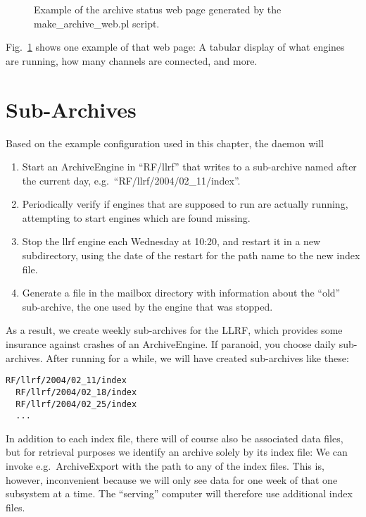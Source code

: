 \begin{figure}[htb]
\begin{center}
\end{center}
\caption{\label{fig:archcfgstat}Example of the archive status web page
  generated by the make\_archive\_web.pl script.}
\end{figure}

\noindent  Fig.~\ref{fig:archcfgstat} shows one example of that web
page: A tabular display of what engines are running, how many channels are
connected, and more.

\section{Sub-Archives}
Based on the example configuration used in this chapter,
the daemon will 
\begin{enumerate}
\item Start an ArchiveEngine in ``RF/llrf'' that writes to
      a sub-archive named after the current day,
      e.g.\ ``RF/llrf/2004/02\_11/index''.
\item Periodically verify if engines that are supposed to run are
      actually running, attempting to start engines which are found missing.
\item Stop the llrf engine each Wednesday at 10:20, and restart it in
      a new subdirectory, using the date of the restart for the path name to the
      new index file.
\item Generate a file in the mailbox directory with information about
      the ``old'' sub-archive, the one used by the engine that was
      stopped.
\end{enumerate}

\noindent As a result, we create weekly sub-archives for the LLRF,
which provides some insurance against crashes of an
ArchiveEngine. If paranoid, you choose daily sub-archives.
After running for a while, we will have created sub-archives like these:
\begin{lstlisting}[frame=none,keywordstyle=\sffamily]
  RF/llrf/2004/02_11/index
  RF/llrf/2004/02_18/index
  RF/llrf/2004/02_25/index
  ...
\end{lstlisting}
\noindent In addition to each index file, there will of course also be
associated data files, but for retrieval purposes we identify an
archive solely by its index file: We can invoke e.g.\ ArchiveExport
with the path to any of the index files. This is, however,
inconvenient because we will only see data for one week of that one
subsystem at a time.
The ``serving'' computer will therefore use additional index files.

